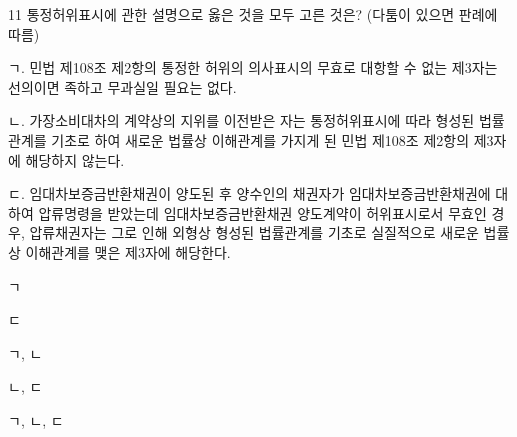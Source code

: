 \begin{question}{11}
통정허위표시에 관한 설명으로 옳은 것을 모두 고른 것은? (다툼이 있으면 판례에 따름)
\begin{framedtext}
ㄱ. 민법 제108조 제2항의 통정한 허위의 의사표시의 무효로 대항할 수 없는 제3자는 선의이면 족하고 무과실일 필요는 없다. \par
ㄴ. 가장소비대차의 계약상의 지위를 이전받은 자는 통정허위표시에 따라 형성된 법률관계를 기초로 하여 새로운 법률상 이해관계를 가지게 된 민법 제108조 제2항의 제3자에 해당하지 않는다. \par
ㄷ. 임대차보증금반환채권이 양도된 후 양수인의 채권자가 임대차보증금반환채권에 대하여 압류명령을 받았는데 임대차보증금반환채권 양도계약이 허위표시로서 무효인 경우, 압류채권자는 그로 인해 외형상 형성된 법률관계를 기초로 실질적으로 새로운 법률상 이해관계를 맺은 제3자에 해당한다. \par
\end{framedtext}
\begin{choices}
  \item ㄱ
  \item ㄷ
  \item ㄱ, ㄴ
  \item ㄴ, ㄷ
  \item ㄱ, ㄴ, ㄷ
\end{choices}
\end{question}

